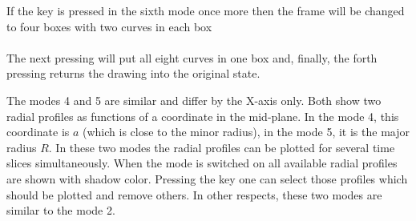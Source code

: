 If the key  is pressed in the sixth mode once more then the
frame will be changed to four boxes with two curves in each box
\bigskip\\
\\[2ex]
The next pressing  will put all eight curves in one box
and, finally, the forth pressing  returns the drawing into
the original state. 

The modes 4 and 5 are similar and differ by the X-axis only.
Both show two radial profiles as functions of a coordinate in the
mid-plane. 
In the mode 4, this coordinate is $a$ (which is close to the minor
radius), in the mode 5, it is the major radius $R.$
In these two modes the radial profiles can be plotted for several time
slices simultaneously. 
When the mode is switched on all available radial profiles are shown
with shadow color.
Pressing the key  one can select those profiles which should be
plotted and remove others.
In other respects, these two modes are similar to the mode 2.

